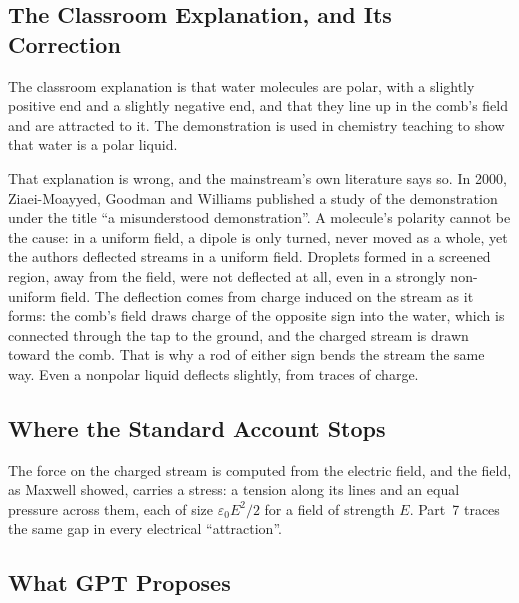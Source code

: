 \subsection*{The Classroom Explanation, and Its Correction}

The classroom explanation is that water molecules are polar, with a slightly positive end and a slightly negative end, and that they line up in the comb's field and are attracted to it. The demonstration is used in chemistry teaching to show that water is a polar liquid.

That explanation is wrong, and the mainstream's own literature says so. In 2000, Ziaei-Moayyed, Goodman and Williams published a study of the demonstration under the title ``a misunderstood demonstration''. A molecule's polarity cannot be the cause: in a uniform field, a dipole is only turned, never moved as a whole, yet the authors deflected streams in a uniform field. Droplets formed in a screened region, away from the field, were not deflected at all, even in a strongly non-uniform field. The deflection comes from charge induced on the stream as it forms: the comb's field draws charge of the opposite sign into the water, which is connected through the tap to the ground, and the charged stream is drawn toward the comb. That is why a rod of either sign bends the stream the same way. Even a nonpolar liquid deflects slightly, from traces of charge.


\subsection*{Where the Standard Account Stops}

The force on the charged stream is computed from the electric field, and the field, as Maxwell showed, carries a stress: a tension along its lines and an equal pressure across them, each of size $\varepsilon_0E^2/2$ for a field of strength $E$.  Part~7 traces the same gap in every electrical ``attraction''.

\subsection*{What GPT Proposes}

